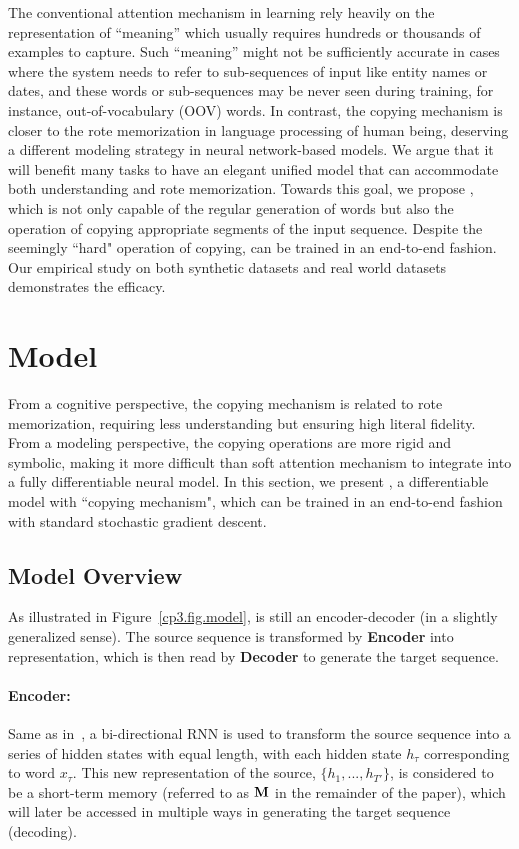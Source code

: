  
The conventional attention mechanism in \sts learning rely heavily on the representation of ``meaning'' which usually requires hundreds or thousands of examples to capture. Such ``meaning'' might not be sufficiently accurate in cases where the system needs to refer to sub-sequences of input like entity names or dates, and these words or sub-sequences may be never seen during training, for instance, out-of-vocabulary (OOV) words. 
In contrast, the copying mechanism is closer to the rote memorization in language processing of human being, 
deserving a different modeling strategy in neural network-based models. We argue that it will benefit many \sts tasks to have an elegant unified model that can accommodate both understanding and rote memorization. Towards this goal, we propose \copynet, which is not only capable of the regular generation of words but also the operation of copying appropriate segments of the input sequence. Despite the seemingly ``hard" operation of copying, \copynet can be trained in an end-to-end fashion. Our empirical study on both synthetic datasets and real world datasets demonstrates the efficacy.     
 
 
\section{Model}
From a cognitive perspective, the copying mechanism is related to rote memorization, requiring less understanding but ensuring high literal fidelity. From a modeling perspective, the copying operations are more rigid and symbolic, making it more difficult than soft attention mechanism to integrate into a fully differentiable neural model.
In this section, we present \copynet, a differentiable \sts model with ``copying mechanism", which can be trained in an end-to-end fashion with standard stochastic gradient descent. 


  
\subsection{Model Overview}
As illustrated in Figure~\ref{cp3.fig.model}, \copynet is still an encoder-decoder (in a slightly generalized sense). The source sequence is transformed by \textbf{Encoder} into 
representation, which is then read by \textbf{Decoder} to generate the target sequence.

\paragraph{Encoder:} Same as in~\cite{bahdanau2014neural}, a bi-directional RNN is used to transform the source sequence into a series of hidden states with equal length, with each hidden state $h_\tau$ corresponding to word $x_\tau$. 
This new representation of the source, $\{h_1, ..., h_{T'}\}$, is considered to be a short-term memory  (referred to as $\mathbf{M}$ in the remainder of the paper), which will later be accessed in multiple ways in generating the target sequence (decoding).

